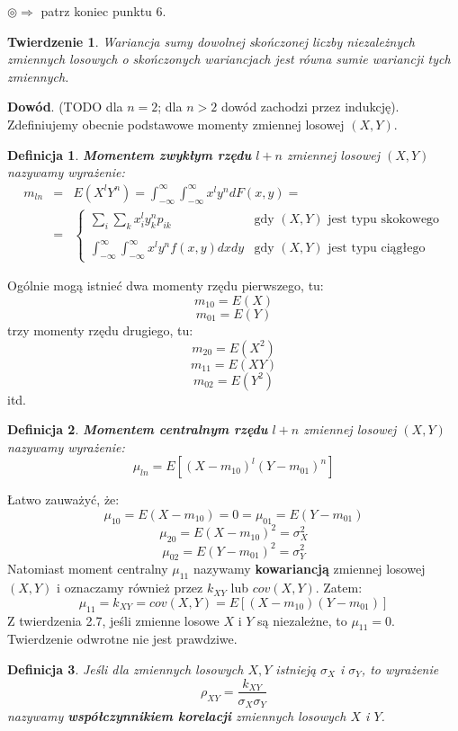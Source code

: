 \documentclass[10pt,a4paper]{article}
\newtheorem{defin}{Definicja}[section]
\newtheorem{twier}{Twierdzenie}[section]
\begin{document}
$\circledcirc\Longrightarrow$ patrz koniec punktu 6.
\begin{twier}
Wariancja sumy dowolnej skończonej liczby niezależnych zmiennych losowych o skończonych wariancjach jest równa sumie wariancji tych zmiennych.
\end{twier}
\textbf{Dowód}. (TODO dla $n=2$; dla $n>2$ dowód zachodzi przez indukcję).\newline\\
Zdefiniujemy obecnie podstawowe momenty zmiennej losowej $(X, Y)$.
\begin{defin}
\textbf{Momentem zwykłym rzędu} $l+n$ zmiennej losowej $(X, Y)$ nazywamy wyrażenie:
\begin{eqnarray}
m_{ln} &=& E(X^lY^n) = \int_{-\infty}^\infty\int_{-\infty}^\infty x^ly^ndF(x,y) = \\\nonumber
&=& \left\{ \begin{array}{ll}
\sum_i\sum_kx_i^ly_k^np_{ik} & \textrm{gdy $(X,Y)$ jest typu skokowego} \\\nonumber\\\nonumber
\int_{-\infty}^\infty\int_{-\infty}^\infty x^ly^nf(x,y)dxdy& \textrm{gdy $(X,Y)$ jest typu ciągłego} 
\end{array}\right.
\end{eqnarray} 
\end{defin}
Ogólnie mogą istnieć dwa momenty rzędu pierwszego, tu:
\[m_{10} = E(X)\]
\[m_{01} = E(Y)\]
trzy momenty rzędu drugiego, tu:
\[m_{20} = E(X^2)\]
\[m_{11} = E(XY)\]
\[m_{02} = E(Y^2)\]
itd.
\begin{defin}
\textbf{Momentem centralnym rzędu} $l+n$ zmiennej losowej $(X,Y)$ nazywamy wyrażenie:
\begin{equation}
\mu_{ln} = E[(X-m_{10})^l(Y-m_{01})^n]
\end{equation}
\end{defin}
Łatwo zauważyć, że:
\[\mu_{10} = E(X-m_{10}) = 0 = \mu_{01} = E(Y-m_{01}) \]
\[\mu_{20} = E(X-m_{10})^2 = \sigma_X^2\]
\[\mu_{02} = E(Y-m_{01})^2 = \sigma_Y^2\]
Natomiast moment centralny $\mu_{11}$ nazywamy \textbf{kowariancją} zmiennej losowej $(X,Y)$ i oznaczamy również przez $k_{XY}$ lub $cov(X,Y)$.
Zatem:
\[\mu_{11} = k_{XY} = cov(X,Y) = E[(X-m_{10})(Y-m_{01})]\]
Z twierdzenia 2.7, jeśli zmienne losowe $X$ i $Y$ są niezależne, to $\mu_{11} = 0$. Twierdzenie odwrotne nie jest prawdziwe.
\begin{defin}
Jeśli dla zmiennych losowych $X, Y$ istnieją $\sigma_X$ i $\sigma_Y$, to wyrażenie
\begin{equation}
\rho_{XY} = \frac{k_{XY}}{\sigma_X\sigma_Y}
\end{equation}
nazywamy \textbf{współczynnikiem korelacji} zmiennych losowych $X$ i $Y$.
\end{defin}
\end{document}
